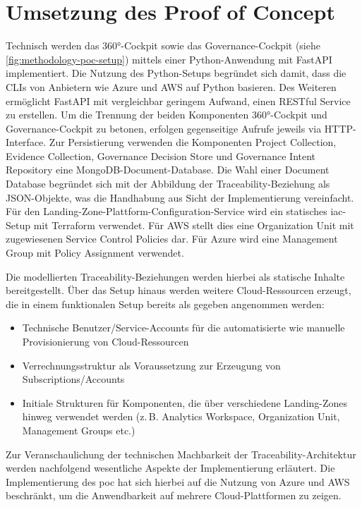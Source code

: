 \section{Umsetzung des Proof of Concept}
\label{sec:umsetzung}

Technisch werden das 360°-Cockpit sowie das Governance-Cockpit (siehe \autoref{fig:methodology-poc-setup}) mittels einer Python-Anwendung mit FastAPI implementiert. Die Nutzung des Python-Setups begründet sich damit, dass die CLIs von Anbietern wie Azure und AWS auf Python basieren. Des Weiteren ermöglicht FastAPI mit vergleichbar geringem Aufwand, einen RESTful Service zu erstellen. Um die Trennung der beiden Komponenten 360°-Cockpit und Governance-Cockpit zu betonen, erfolgen gegenseitige Aufrufe jeweils via HTTP-Interface. Zur Persistierung verwenden die Komponenten Project Collection, Evidence Collection, Governance Decision Store und Governance Intent Repository eine MongoDB-Document-Database. Die Wahl einer Document Database begründet sich mit der Abbildung der Traceability-Beziehung als JSON-Objekte, was die Handhabung aus Sicht der Implementierung vereinfacht. Für den Landing-Zone-Plattform-Configuration-Service wird ein statisches \ac{iac}-Setup mit Terraform verwendet. Für AWS stellt dies eine Organization Unit mit zugewiesenen Service Control Policies dar. Für Azure wird eine Management Group mit Policy Assignment verwendet.

Die modellierten Traceability-Beziehungen werden hierbei als statische Inhalte bereitgestellt. Über das Setup hinaus werden weitere Cloud-Ressourcen erzeugt, die in einem funktionalen Setup bereits als gegeben angenommen werden:

\begin{itemize}
    \item Technische Benutzer/Service-Accounts für die automatisierte wie manuelle Provisionierung von Cloud-Ressourcen
    \item Verrechnungsstruktur als Voraussetzung zur Erzeugung von Subscriptions/Accounts
    \item Initiale Strukturen für Komponenten, die über verschiedene Landing-Zones hinweg verwendet werden (z.\,B. Analytics Workspace, Organization Unit, Management Groups etc.)
\end{itemize}

Zur Veranschaulichung der technischen Machbarkeit der Traceability-Architektur werden nachfolgend wesentliche Aspekte der Implementierung erläutert. Die Implementierung des \ac{poc} hat sich hierbei auf die Nutzung von Azure und AWS beschränkt, um die Anwendbarkeit auf mehrere Cloud-Plattformen zu zeigen.

